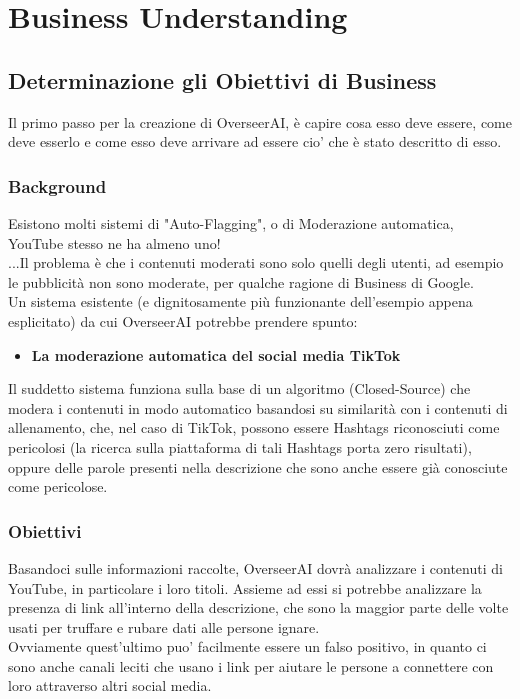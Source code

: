 \documentclass[a4paper,12pt]{report}
\begin{document}
\chapter{Business Understanding}
\vspace*{\fill}%
\endgroup
\newpage

\section{Determinazione gli Obiettivi di Business}
Il primo passo per la creazione di OverseerAI, è capire cosa esso deve essere, come deve esserlo e come esso deve arrivare ad essere cio' che è stato descritto di esso.
\subsection{Background}
Esistono molti sistemi di "Auto-Flagging", o di Moderazione automatica, YouTube stesso ne ha almeno uno!\\
...Il problema è che i contenuti moderati sono solo quelli degli utenti, ad esempio le pubblicità non sono moderate, per qualche ragione di Business di Google.\\
Un sistema esistente (e dignitosamente più funzionante dell'esempio appena esplicitato) da cui OverseerAI potrebbe prendere spunto:
\begin{itemize}
    \item \textbf{La moderazione automatica del social media TikTok}
\end{itemize}
Il suddetto sistema funziona sulla base di un algoritmo (Closed-Source) che modera i contenuti in modo automatico basandosi su similarità con i contenuti di allenamento, che, nel caso di TikTok, possono essere Hashtags riconosciuti come pericolosi (la ricerca sulla piattaforma di tali Hashtags porta zero risultati), oppure delle parole presenti nella descrizione che sono anche essere già conosciute come pericolose.\\

\subsection{Obiettivi}
Basandoci sulle informazioni raccolte, OverseerAI dovrà analizzare i contenuti di YouTube, in particolare i loro titoli. Assieme ad essi si potrebbe analizzare la presenza di link all'interno della descrizione, che sono la maggior parte delle volte usati per truffare e rubare dati alle persone ignare.\\
Ovviamente quest'ultimo puo' facilmente essere un falso positivo, in quanto ci sono anche canali leciti che usano i link per aiutare le persone a connettere con loro attraverso altri social media.
\end{document}
